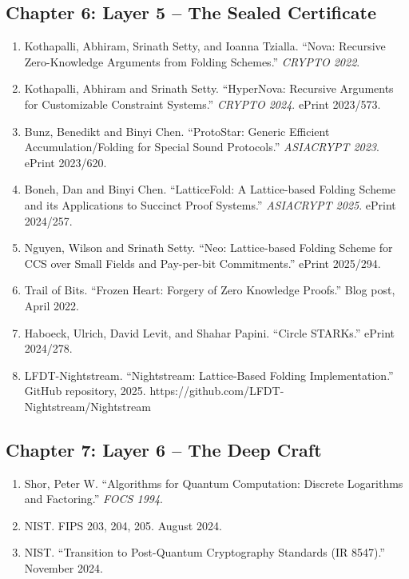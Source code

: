 \documentclass[
  11pt,
  openany]{report}
\providecommand{\tightlist}{%
  \setlength{\itemsep}{0pt}\setlength{\parskip}{0pt}}
\begin{document}
\subsection{Chapter 6: Layer 5 -- The Sealed
Certificate}\label{chapter-6-layer-5-the-sealed-certificate-1}

\begin{enumerate}
\def\labelenumi{\arabic{enumi}.}
\setcounter{enumi}{16}
\tightlist
\item
  Kothapalli, Abhiram, Srinath Setty, and Ioanna Tzialla. ``Nova: Recursive
  Zero-Knowledge Arguments from Folding Schemes.'' \emph{CRYPTO 2022}.
\item
  Kothapalli, Abhiram and Srinath Setty. ``HyperNova: Recursive Arguments for
  Customizable Constraint Systems.'' \emph{CRYPTO 2024}. ePrint 2023/573.
\item
  Bunz, Benedikt and Binyi Chen. ``ProtoStar: Generic Efficient
  Accumulation/Folding for Special Sound Protocols.'' \emph{ASIACRYPT 2023}.
  ePrint 2023/620.
\item
  Boneh, Dan and Binyi Chen. ``LatticeFold: A Lattice-based Folding Scheme and
  its Applications to Succinct Proof Systems.'' \emph{ASIACRYPT 2025}. ePrint
  2024/257.
\item
  Nguyen, Wilson and Srinath Setty. ``Neo: Lattice-based Folding Scheme for CCS
  over Small Fields and Pay-per-bit Commitments.'' ePrint 2025/294.
\item
  Trail of Bits. ``Frozen Heart: Forgery of Zero Knowledge Proofs.'' Blog post,
  April 2022.
\item
  Haboeck, Ulrich, David Levit, and Shahar Papini. ``Circle STARKs.'' ePrint
  2024/278.
\item
  LFDT-Nightstream. ``Nightstream: Lattice-Based Folding Implementation.''
  GitHub repository, 2025. https://github.com/LFDT-Nightstream/Nightstream
\end{enumerate}

\subsection{Chapter 7: Layer 6 -- The Deep
Craft}\label{chapter-7-layer-6-the-deep-craft-1}

\begin{enumerate}
\def\labelenumi{\arabic{enumi}.}
\setcounter{enumi}{23}
\tightlist
\item
  Shor, Peter W. ``Algorithms for Quantum Computation: Discrete Logarithms and
  Factoring.'' \emph{FOCS 1994}.
\item
  NIST. FIPS 203, 204, 205. August 2024.
\item
  NIST. ``Transition to Post-Quantum Cryptography Standards (IR 8547).''
  November 2024.
\end{enumerate}
\end{document}
